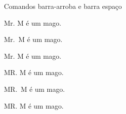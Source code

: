\documentclass[12pt]{memoir}
\begin{document}
{\Large Comandos barra-arroba e barra espaço}

Mr. M é um mago. %

Mr.\ M é um mago. %

Mr\@. M é um mago. %

\bigskip

MR. M é um mago. %

MR.\ M é um mago. %

MR\@. M é um mago. %
\end{document}
